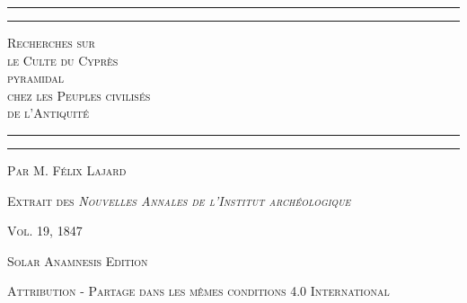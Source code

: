 \documentclass[a4paper, 11pt, oneside, polutonikogreek, french]{article}
\begin{document}
\renewcommand\thefootnote{\scriptsize{\arabic{footnote}}}
\let\oldfootnote\footnote
    \renewcommand{\footnote}[1]{\oldfootnote{\bfseries\scriptsize#1}}
\bfseries
{}
\pagestyle{plain}
\begin{titlepage} %
	\centering %

	
	\rule{\textwidth}{1.6pt}\vspace*{-\baselineskip}\vspace*{2pt} %
	\rule{\textwidth}{0.4pt} %
	
	{\scshape\Large Recherches sur \\ le Culte du Cyprès \\ pyramidal \\ chez les Peuples civilisés \\ de l'Antiquité}
	
	\rule{\textwidth}{0.4pt}\vspace*{-\baselineskip}\vspace{3.2pt} %
	\rule{\textwidth}{1.6pt} %

	
	\vspace{0.25\baselineskip}
	
	{\small\scshape Par \normalsize M. Félix Lajard} %
	
    \vspace*{\fill} 
	
	

	\vspace{0.25\baselineskip}

	{\footnotesize\scshape Extrait des \emph{Nouvelles Annales de l'Institut archéologique}}
	
	{\footnotesize\scshape{Vol. 19, 1847}}
	
	\vspace{0.25\baselineskip} %

    {\footnotesize\scshape Solar Anamnesis Edition}  %
	
	{\scshape\footnotesize Attribution - Partage dans les mêmes conditions 4.0 International} %
\end{titlepage}
\setlength{\parskip}{1mm plus1mm minus1mm}
\setcounter{tocdepth}{3}
\setcounter{secnumdepth}{3}
\small
{\footnotesize \tableofcontents}
\clearpage
{\footnotesize \listoffigures}
\clearpage
\end{document}
